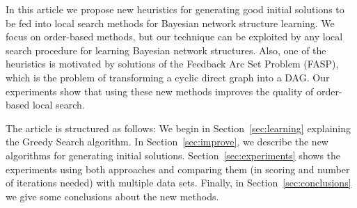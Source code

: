 In this article we propose new heuristics for generating good initial
solutions to be fed into local search methods for Bayesian network
structure learning. We focus on order-based methods, but our technique
can be exploited by any local search procedure for learning Bayesian
network structures. Also, one of the heuristics is motivated by solutions of the
Feedback Arc Set Problem (FASP), which is the problem of transforming a
cyclic direct graph into a DAG. Our experiments show that using these
new methods improves the quality of order-based local search.

The article is structured as follows: We begin in
Section~\ref{sec:learning} explaining the Greedy Search algorithm. In
Section~\ref{sec:improve}, we describe the new algorithms for generating
initial solutions. Section~\ref{sec:experiments} shows the experiments
using both approaches and comparing them (in scoring and number of iterations needed) with
multiple data sets. Finally, in Section~\ref{sec:conclusions} we give
some conclusions about the new methods.
